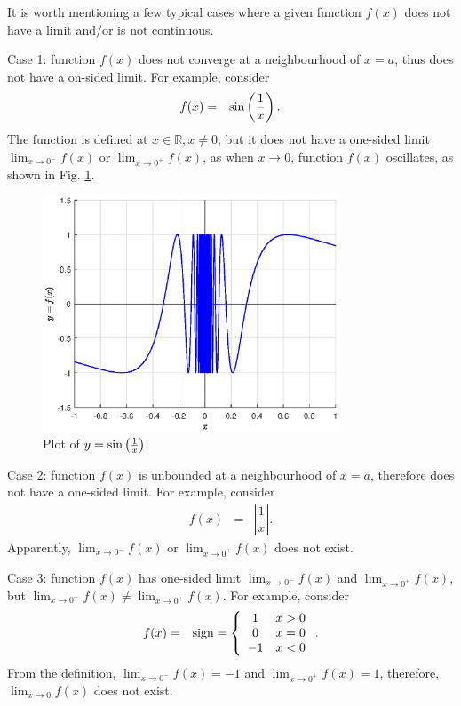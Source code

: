 It is worth mentioning a few typical cases where a given function $f(x)$ does not have a limit and/or is not continuous.

Case 1: function $f(x)$ does not converge at a neighbourhood of $x=a$, thus does not have a on-sided limit. For example, consider
\begin{eqnarray}
  f(x) &=& \textup{sin}\left(\dfrac{1}{x}\right). \nonumber
\end{eqnarray}
The function is defined at $x\in\mathbb{R},x\neq0$, but it does not have a one-sided limit $\lim_{x\rightarrow 0^-}f(x)$ or $\lim_{x\rightarrow 0^+}f(x)$, as when $x\rightarrow0$, function $f(x)$ oscillates, as shown in Fig. \ref{ch1fig:sinoneoverx}.

\begin{figure}
\centering
\includegraphics[width=250pt]{chapters/chapter1/figures/fig_sinoneoverx.eps}
\caption{Plot of $y=\textup{sin}\left(\frac{1}{x}\right)$.} \label{ch1fig:sinoneoverx}
\end{figure}

Case 2: function $f(x)$ is unbounded at a neighbourhood of $x=a$, therefore does not have a one-sided limit. For example, consider
\begin{eqnarray}
  f(x) &=& \left|\dfrac{1}{x}\right|. \nonumber
\end{eqnarray}
Apparently, $\lim_{x\rightarrow 0^-}f(x)$ or $\lim_{x\rightarrow 0^+}f(x)$ does not exist.

Case 3: function $f(x)$ has one-sided limit $\lim_{x\rightarrow 0^-}f(x)$ and $\lim_{x\rightarrow 0^+}f(x)$, but $\lim_{x\rightarrow 0^-}f(x) \neq \lim_{x\rightarrow 0^+}f(x)$. For example, consider
\begin{eqnarray}
  f(x) &=& \textup{sign} = \left\{\begin{array}{cc}
                                    1 & x > 0 \\
                                    0 & x = 0 \\
                                    -1 & x < 0
                                  \end{array}\right..\nonumber
\end{eqnarray}
From the definition, $\lim_{x\rightarrow 0^-}f(x)=-1$ and $\lim_{x\rightarrow 0^+}f(x)=1$, therefore, $\lim_{x\rightarrow 0}f(x)$ does not exist.

